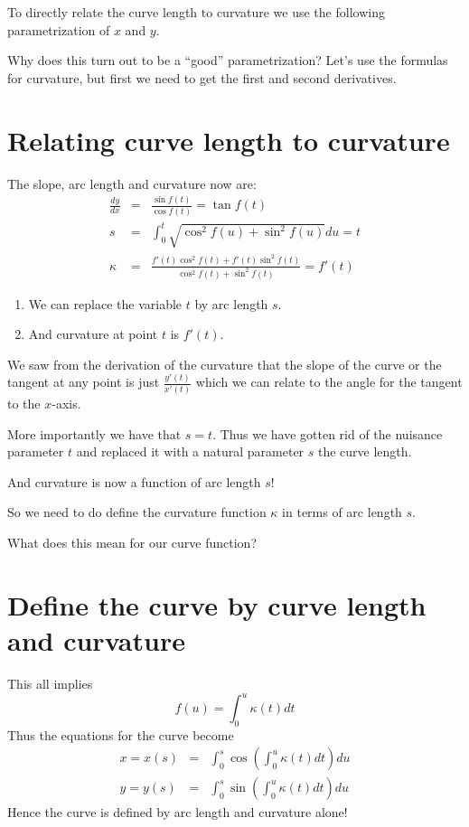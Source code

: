 \documentclass[12pt]{article} %
\theoremstyle{definition}
\theoremstyle{theorem}
\begin{document}
To directly relate the curve length to curvature we use the following parametrization of $x$ and $y$. 

Why does this turn out to be a ``good'' parametrization? Let's use the formulas for curvature, but first we need to get the first and second derivatives.

\section{Relating curve length to curvature}
\begin{tcolorbox}
	The slope, arc length and curvature now are:
	\begin{eqnarray*}
	\frac{dy}{dx} &=& \frac{\sin f(t)}{\cos f(t)} = \tan f(t) \\
 	s &=& \int_0^t \sqrt{\cos^2 f(u) + \sin^2 f(u)} du = t \\
 	\kappa &=& \frac{f'(t) \cos^2 f(t) + f'(t) \sin^2 f(t)}{\cos^2 f(t) + \sin^2 f(t)} = f'(t)
 \end{eqnarray*}
	\begin{enumerate}
		\item We can replace the variable $t$ by arc length $s$.
		\item And curvature at point $t$ is $f'(t)$. 
	\end{enumerate}
\end{tcolorbox}

We saw from the derivation of the curvature that the slope of the curve or the tangent at any point is just $\frac{y'(t)}{x'(t)}$ which we can relate to the angle for the tangent to the $x$-axis.

More importantly we have that $s=t$. Thus we have gotten rid of the nuisance parameter $t$ and replaced it with a natural parameter $s$ the curve length.

And curvature is now a function of arc length $s$! 

So we need to do define the curvature function $\kappa$ in terms of arc length $s$.

What does this mean for our curve function?

\section{Define the curve by curve length and curvature}
\begin{tcolorbox}
	 This all implies
	 \[
	 f(u) = \int_{0}^{u} \kappa(t) dt
	 \]
	Thus the equations for the curve become
	\begin{eqnarray*}
	x = x(s) &=& \int_{0}^{s} \cos \left( \int_0^u \kappa(t) dt \right) du \\
	y = y(s) &=& \int_{0}^{s} \sin \left( \int_0^u \kappa(t) dt \right) du
	\end{eqnarray*}
	Hence the curve is defined by arc length and curvature alone!
\end{tcolorbox}
\end{document}
